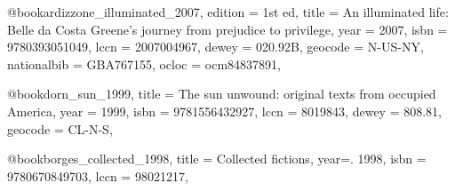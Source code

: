 
@book{ardizzone_illuminated_2007,
	edition = {1st ed},
	title = {An illuminated life: {Belle} da {Costa} {Greene}'s journey from prejudice to privilege},
	year = {2007},
	isbn = {9780393051049},
  lccn = {2007004967},
  dewey = {020.92B},
  geocode = {N-US-NY},
  nationalbib = {GBA767155},
  ocloc = {ocm84837891},
}

@book{dorn_sun_1999,
	title = {The sun unwound: original texts from occupied {America}},
	year = {1999},
	isbn = {9781556432927},
  lccn = {8019843},
  dewey = {808.81},
  geocode = {CL-N-S},
}

@book{borges_collected_1998,
	title = {Collected fictions},
  year=. {1998},
	isbn = {9780670849703},
  lccn = {98021217},
}
